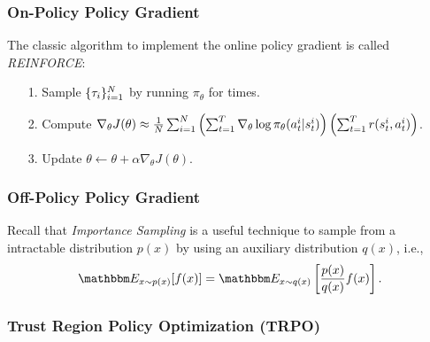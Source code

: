 \subsubsection{On-Policy Policy Gradient}
The classic algorithm to implement the online policy gradient is called \emph{REINFORCE}:
    \begin{itemize}
        \item[1.] Sample $\{ \tau_i \}_{i=1}^{N}$ by running $\pi_{\theta}$ for \ndata times.
        \item[2.] Compute $\nabla_\theta J(\theta) \approx \frac{1}{N}\sum_{i=1}^{N}{
        \left(\sum_{t=1}^{T}{\nabla_\theta\log \pi_\theta(a_t^i | s_t^i)}\right)
        \left(\sum_{t=1}^{T}{r(s_t^i, a_t^i)} \right)
        }$.
        \item[3.] Update $\theta \leftarrow \theta + \alpha \nabla_\theta J(\theta)$.
    \end{itemize}
    
    
    
\subsubsection{Off-Policy Policy Gradient}
Recall that \emph{Importance Sampling} is a useful technique to sample from a intractable distribution $p(x)$ by using an auxiliary distribution $q(x)$, i.e., 
    \begin{equation}
        \E_{x \sim p(x)}[f(x)] = \E_{x \sim q(x)}\left[ \frac{p(x)}{q(x)}f(x) \right].
    \end{equation}



\subsubsection{Trust Region Policy Optimization (TRPO)}




